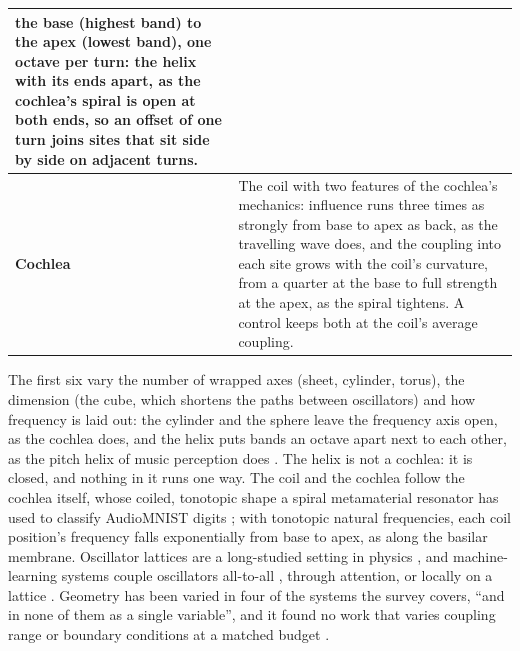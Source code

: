 \documentclass[10pt]{article}
\newcounter{none} %
\begin{document}
\begin{longtable}[]{@{}
  >{\raggedright\arraybackslash}p{}
  >{\raggedright\arraybackslash}p{}@{}}
the base (highest band) to the apex (lowest band), one octave per turn:
the helix with its ends apart, as the cochlea's spiral is open at both
ends, so an offset of one turn joins sites that sit side by side on
adjacent turns. \\
\cmidrule{1-2}\textbf{Cochlea} & The coil with two features of the
cochlea's mechanics: influence runs three times as strongly from base to
apex as back, as the travelling wave does, and the coupling into each
site grows with the coil's curvature, from a quarter at the base to full
strength at the apex, as the spiral tightens. A control keeps both at
the coil's average coupling. \\
\end{longtable}

The first six vary the number of wrapped axes (sheet, cylinder, torus),
the dimension (the cube, which shortens the paths between oscillators)
and how frequency is laid out: the cylinder and the sphere leave the
frequency axis open, as the cochlea does, and the helix puts bands an
octave apart next to each other, as the pitch helix of music perception
does \citep{shepard1982}. The helix is not a cochlea: it is closed, and
nothing in it runs one way. The coil and the cochlea follow the cochlea
itself, whose coiled, tonotopic shape a spiral metamaterial resonator
has used to classify AudioMNIST digits \citep{beoletto2026}; with
tonotopic natural frequencies, each coil position's frequency falls
exponentially from base to apex, as along the basilar membrane.
Oscillator lattices are a long-studied setting in physics
\citep{sakaguchi1987}, and machine-learning systems couple oscillators
all-to-all \citep{unconv-ai2026}, through attention, or locally on a
lattice \citep{keller2023, miyato2025}. Geometry has been varied in four
of the systems the survey covers, ``and in none of them as a single
variable'', and it found no work that varies coupling range or boundary
conditions at a matched budget \citep{kryski2026}.
\end{document}
